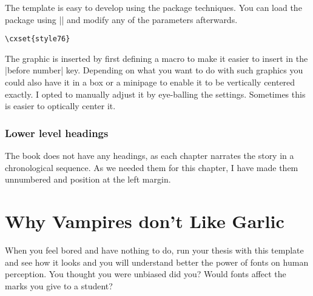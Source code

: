 The template is easy to develop using the  package techniques. You can load the package using
|\cxsetstyle| and modify any of the parameters afterwards.

\begin{verbatim}
\cxset{style76}
\end{verbatim}

The graphic is inserted by first defining a macro to make it easier to insert in the |before number| key. Depending on what you want to do with such graphics you could also have it in a box or a minipage to enable it to be vertically centered exactly. I opted to manually adjust it by eye-balling the settings. Sometimes this is easier to    optically center it. 

\subsection{Lower level headings}

The book does not have any headings, as each chapter narrates the story in a chronological sequence. As we needed them for this chapter, I have made them unnumbered and position at the left margin.




\chapter{Why Vampires don’t Like Garlic}

When you feel bored and have nothing to do, run your thesis with this template and see how it looks and you will understand better the power of fonts on human perception. You thought you were unbiased did you? Would fonts affect the marks you give to a student?

















\makeatother
